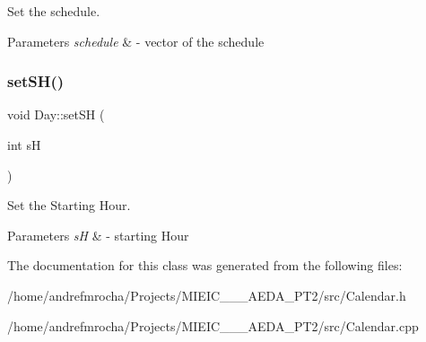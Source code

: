 Set the schedule. 


\begin{DoxyParams}{Parameters}
{\em schedule} & -\/ vector of the schedule \\
\hline
\end{DoxyParams}
\mbox{\label{class_day_a6fc6dfeef1c92b9a5395648c4d0c8a70}} 
\subsubsection{\texorpdfstring{set\+S\+H()}{setSH()}}
{\footnotesize\ttfamily void Day\+::set\+SH (\begin{DoxyParamCaption}\item[{int}]{sH }\end{DoxyParamCaption})}



Set the Starting Hour. 


\begin{DoxyParams}{Parameters}
{\em sH} & -\/ starting Hour \\
\hline
\end{DoxyParams}


The documentation for this class was generated from the following files\+:\begin{DoxyCompactItemize}
\item 
/home/andrefmrocha/\+Projects/\+M\+I\+E\+I\+C\+\_\+\_\+\_\+\+A\+E\+D\+A\+\_\+\+P\+T2/src/Calendar.\+h\item 
/home/andrefmrocha/\+Projects/\+M\+I\+E\+I\+C\+\_\+\_\+\_\+\+A\+E\+D\+A\+\_\+\+P\+T2/src/Calendar.\+cpp\end{DoxyCompactItemize}
